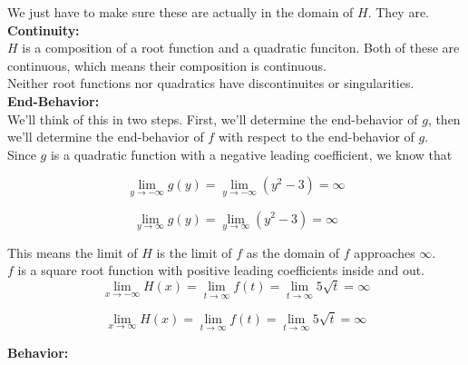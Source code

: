 \documentclass{ximera}
\begin{document}
We just have to make sure these are actually in the domain of $H$.  They are. \\






\textbf{\textcolor{blue!55!black}{Continuity:}} \\


$H$ is a composition of a root function and a quadratic funciton.  Both of these are continuous, which means their composition is continuous. \\

Neither root functions nor quadratics have discontinuites or singularities. \\





\textbf{\textcolor{blue!55!black}{End-Behavior:}} \\



We'll think of this in two steps. First, we'll determine the end-behavior of $g$, then we'll determine the end-behavior of $f$ with respect to the end-behavior of $g$.\\


Since $g$ is a quadratic function with a negative leading coefficient, we know that 

\[
\lim\limits_{y \to -\infty} g(y) = \lim\limits_{y \to -\infty} (y^2 - 3)  = \infty
\]


\[
\lim\limits_{y \to \infty} g(y) = \lim\limits_{y \to \infty} (y^2 - 3)  = \infty
\]

This means the limit of $H$ is the limit of $f$ as the domain of $f$ approaches $\infty$. \\


$f$ is a square root function with positive leading coefficients inside and out. \\

\[
\lim\limits_{x \to -\infty} H(x) =  \lim\limits_{t \to \infty} f(t)  = \lim\limits_{t \to \infty} 5\sqrt{t} = \infty
\]


\[
\lim\limits_{x \to \infty} H(x) =  \lim\limits_{t \to \infty} f(t)  = \lim\limits_{t \to \infty} 5\sqrt{t} = \infty
\]









\textbf{\textcolor{blue!55!black}{Behavior:}} \\
\end{document}
